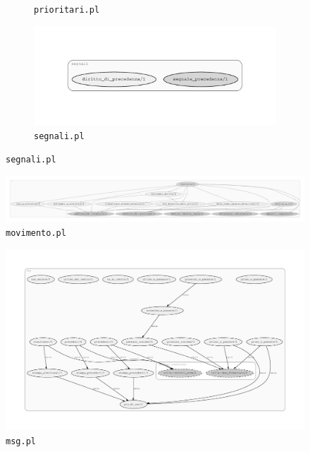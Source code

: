 \begin{figure}
\begin{subfigure}[b]{.4\textwidth}
		\caption{\texttt{prioritari.pl}}
	\end{subfigure}
	\begin{subfigure}[b]{.4\textwidth}
		\includegraphics[width=\textwidth]{diagrams/segnali}
		\caption{\texttt{segnali.pl}}
	\end{subfigure}
\end{figure}

\begin{figure}
	\includegraphics[width=\textwidth, height=\textheight, keepaspectratio]{diagrams/movimento}
	\caption{\texttt{movimento.pl}}
\end{figure}

\begin{figure}
	\includegraphics[width=\textwidth, height=\textheight, keepaspectratio]{diagrams/msg}
	\caption{\texttt{msg.pl}}
\end{figure}

